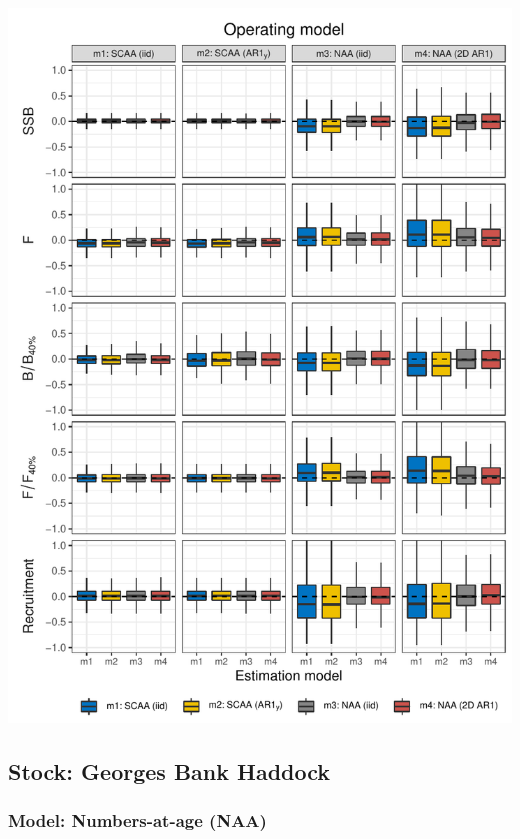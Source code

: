 \documentclass[]{article}
\begin{document}
\includegraphics[width=6in]{wham-sim-paper_files/figure-latex/unnamed-chunk-3-4}

\pagebreak

\pagebreak

\hypertarget{stock-georges-bank-haddock}{%
\subsection{Stock: Georges Bank
Haddock}\label{stock-georges-bank-haddock}}

\hypertarget{model-numbers-at-age-naa-4}{%
\subsubsection{Model: Numbers-at-age
(NAA)}\label{model-numbers-at-age-naa-4}}
\end{document}
